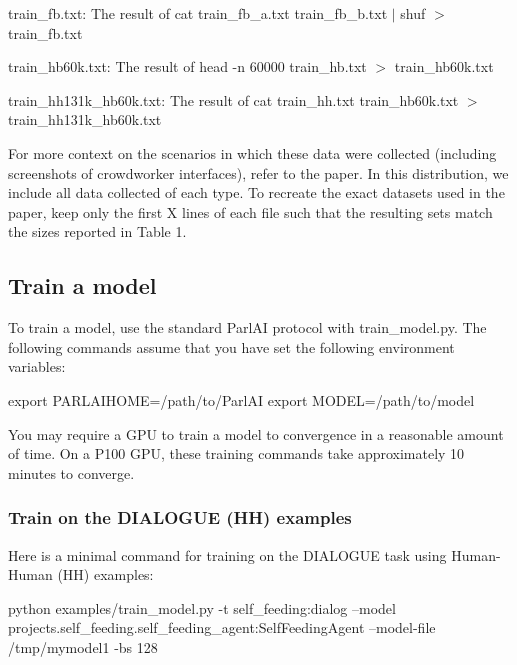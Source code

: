 \begin{DoxyItemize}
\item {\ttfamily train\+\_\+fb.\+txt}\+: The result of {\ttfamily cat train\+\_\+fb\+\_\+a.\+txt train\+\_\+fb\+\_\+b.\+txt $\vert$ shuf $>$ train\+\_\+fb.\+txt}
\item {\ttfamily train\+\_\+hb60k.\+txt}\+: The result of {\ttfamily head -\/n 60000 train\+\_\+hb.\+txt $>$ train\+\_\+hb60k.\+txt}
\item {\ttfamily train\+\_\+hh131k\+\_\+hb60k.\+txt}\+: The result of {\ttfamily cat train\+\_\+hh.\+txt train\+\_\+hb60k.\+txt $>$ train\+\_\+hh131k\+\_\+hb60k.\+txt}
\end{DoxyItemize}

For more context on the scenarios in which these data were collected (including screenshots of crowdworker interfaces), refer to the paper. In this distribution, we include all data collected of each type. To recreate the exact datasets used in the paper, keep only the first X lines of each file such that the resulting sets match the sizes reported in Table 1.

\subsection*{Train a model}

To train a model, use the standard {\ttfamily Parl\+AI} protocol with {\ttfamily train\+\_\+model.\+py}. The following commands assume that you have set the following environment variables\+:


\begin{DoxyCode}
export PARLAIHOME=/path/to/ParlAI
export MODEL=/path/to/model
\end{DoxyCode}


You may require a G\+PU to train a model to convergence in a reasonable amount of time. On a P100 G\+PU, these training commands take approximately 10 minutes to converge.

\subsubsection*{Train on the D\+I\+A\+L\+O\+G\+UE (HH) examples}

Here is a minimal command for training on the D\+I\+A\+L\+O\+G\+UE task using Human-\/\+Human (HH) examples\+:


\begin{DoxyCode}
python examples/train\_model.py -t self\_feeding:dialog --model
       projects.self\_feeding.self\_feeding\_agent:SelfFeedingAgent --model-file /tmp/mymodel1 -bs 128
\end{DoxyCode}


